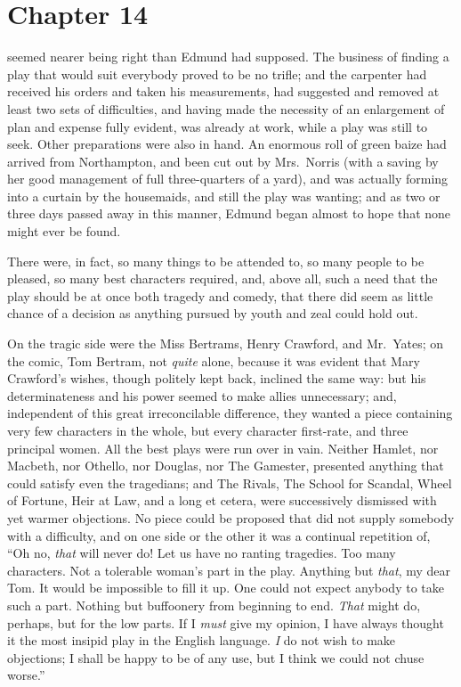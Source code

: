 \chapter{Chapter 14}

 seemed nearer being right than Edmund had supposed.
The business of finding a play that would suit everybody
proved to be no trifle; and the carpenter had received
his orders and taken his measurements, had suggested
and removed at least two sets of difficulties, and having
made the necessity of an enlargement of plan and expense
fully evident, was already at work, while a play was
still to seek.  Other preparations were also in hand.
An enormous roll of green baize had arrived from Northampton,
and been cut out by Mrs.\ Norris (with a saving by her
good management of full three-quarters of a yard), and
was actually forming into a curtain by the housemaids,
and still the play was wanting; and as two or three days
passed away in this manner, Edmund began almost to hope
that none might ever be found.

There were, in fact, so many things to be attended to,
so many people to be pleased, so many best characters
required, and, above all, such a need that the play
should be at once both tragedy and comedy, that there
did seem as little chance of a decision as anything
pursued by youth and zeal could hold out.

On the tragic side were the Miss Bertrams, Henry Crawford,
and Mr.\ Yates; on the comic, Tom Bertram, not \emph{quite} alone,
because it was evident that Mary Crawford's wishes,
though politely kept back, inclined the same way:  but his
determinateness and his power seemed to make allies unnecessary;
and, independent of this great irreconcilable difference,
they wanted a piece containing very few characters
in the whole, but every character first-rate, and three
principal women.  All the best plays were run over in vain.
Neither Hamlet, nor Macbeth, nor Othello, nor Douglas,
nor The Gamester, presented anything that could satisfy
even the tragedians; and The Rivals, The School for Scandal,
Wheel of Fortune, Heir at Law, and a long et cetera,
were successively dismissed with yet warmer objections.
No piece could be proposed that did not supply somebody
with a difficulty, and on one side or the other it was
a continual repetition of, ``Oh no, \emph{that} will never do!
Let us have no ranting tragedies.  Too many characters.
Not a tolerable woman's part in the play.  Anything but \emph{that},
my dear Tom.  It would be impossible to fill it up.
One could not expect anybody to take such a part.
Nothing but buffoonery from beginning to end.
\emph{That} might do, perhaps, but for the low parts.  If I
\emph{must} give my opinion, I have always thought it the most
insipid play in the English language.  \emph{I} do not wish
to make objections; I shall be happy to be of any use, but I
think we could not chuse worse.''

